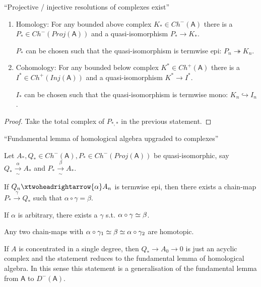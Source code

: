 \documentclass[fontsize=11pt,fleqn,a4paper]{scrartcl}
\begin{document}
\begin{lemma}
\enquote{Projective / injective resolutions of complexes exist}

\begin{multicols}{2}
\begin{enumerate}
\item Homology: For any bounded above complex $K_\ast\in Ch^-(\mathsf{A})$ there is a $P_\ast \in Ch^-(Proj(\mathsf{A}))$ and a quasi-isomorphism $P_\ast \to K_\ast$.

$P_\ast$ can be chosen such that the quasi-isomorphism is termwise epi: $P_n\twoheadrightarrow K_n$.

\item Cohomology: For any bounded below complex $K^\ast\in Ch^+(\mathsf{A})$ there is a $I^\ast \in Ch^+(Inj(\mathsf{A}))$ and a quasi-isomorphism $K^\ast \to I^\ast$.

$I_\ast$ can be chosen such that the quasi-isomorphism is termwise mono: $K_n \hookrightarrow I_n$.
\end{enumerate}
\end{multicols}
\end{lemma}
\begin{proof}
Take the total complex of $P_{\ast,\ast}$ in the previous statement.
\end{proof}

\begin{lemma}
\enquote{Fundamental lemma of homological algebra upgraded to complexes}

Let $A_\ast,Q_\ast \in Ch^-(\mathsf{A}), P_\ast\in Ch^-(Proj(\mathsf{A}))$ be quasi-isomorphic, say $Q_\ast \xrightarrow[\sim]{\alpha} A_\ast$ and $P_\ast \xrightarrow[\sim]{\beta} A_\ast$.

If $Q_n \xtwoheadrightarrow{\alpha} A_n$ is termwise epi, then there exists a chain-map $P_\ast \xrightarrow{\gamma} Q_\ast$ such that $\alpha\circ\gamma = \beta$.

If $\alpha$ is arbitrary, there exists a $\gamma$ s.t. $\alpha\circ\gamma \simeq \beta$.

Any two chain-maps with $\alpha\circ\gamma_1\simeq\beta\simeq\alpha\circ\gamma_2$ are homotopic.
\end{lemma}
\begin{remark}
If $A$ is concentrated in a single degree, then $Q_\ast \to A_0\to 0$ is just an acyclic complex and the statement reduces to the fundamental lemma of homological algebra. In this sense this statement is a generalisation of the fundamental lemma from $\mathsf{A}$ to $D^-(\mathsf{A})$.
\end{remark}
\end{document}
